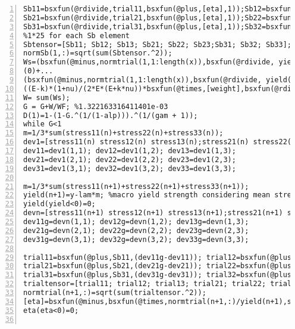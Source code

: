 \begin{lstlisting}[numbers=left, numberstyle=\tiny, keywordstyle=\color{blue!100}, commentstyle=\color{red!30!green!100!blue!100}, frame=shadowbox, rulesepcolor=\color{red!20!green!20!blue!20}]
Sb11=bsxfun(@rdivide,trial11,bsxfun(@plus,[eta],1));Sb12=bsxfun(@rdivide,trial12,bsxfun(@plus,[eta],1));Sb13=bsxfun(@rdivide,trial13,bsxfun(@plus,[eta],1));
Sb21=bsxfun(@rdivide,trial21,bsxfun(@plus,[eta],1));Sb22=bsxfun(@rdivide,trial22,bsxfun(@plus,[eta],1));Sb23=bsxfun(@rdivide,trial23,bsxfun(@plus,[eta],1));
Sb31=bsxfun(@rdivide,trial31,bsxfun(@plus,[eta],1));Sb32=bsxfun(@rdivide,trial32,bsxfun(@plus,[eta],1));Sb33=bsxfun(@rdivide,trial33,bsxfun(@plus,[eta],1));
%1*25 for each Sb element
Sbtensor=[Sb11; Sb12; Sb13; Sb21; Sb22; Sb23;Sb31; Sb32; Sb33];
normSb(1,:)=sqrt(sum(Sbtensor.^2));
Ws=(bsxfun(@minus,normtrial(1,1:length(x)),bsxfun(@rdivide, yield(1),[s]))<=0).*...
(0)+...
(bsxfun(@minus,normtrial(1,1:length(x)),bsxfun(@rdivide, yield(1),[s]))>0).*...
((E-k)*(1+nu)/(2*E*(E+k*nu))*bsxfun(@times,[weight],bsxfun(@rdivide,bsxfun(@times,bsxfun(@minus,normtrial(1,1:length(x)),bsxfun(@rdivide, yield(1),[s])),yield(1)),[s])));
W= sum(Ws); 
G = G+W/WF; %1.322163316411401e-03
D(1)=1-(1-G.^(1/(1-alp))).^(1/(gam + 1));
while G<1
m=1/3*sum(stress11(n)+stress22(n)+stress33(n));
dev1=[stress11(n) stress12(n) stress13(n);stress21(n) stress22(n) stress23(n);stress31(n) stress32(n) stress33(n)]-m*diag([1,1,1]);
dev11=dev1(1,1); dev12=dev1(1,2); dev13=dev1(1,3);
dev21=dev1(2,1); dev22=dev1(2,2); dev23=dev1(2,3);
dev31=dev1(3,1); dev32=dev1(3,2); dev33=dev1(3,3);

m=1/3*sum(stress11(n+1)+stress22(n+1)+stress33(n+1));
yield(n+1)=y-lam*m; %macro yield strength considering mean stress effect
yield(yield<0)=0;
devn=[stress11(n+1) stress12(n+1) stress13(n+1);stress21(n+1) stress22(n+1) stress23(n+1);stress31(n+1) stress32(n+1) stress33(n+1)]-m*diag([1,1,1]);
dev11g=devn(1,1); dev12g=devn(1,2); dev13g=devn(1,3);
dev21g=devn(2,1); dev22g=devn(2,2); dev23g=devn(2,3);
dev31g=devn(3,1); dev32g=devn(3,2); dev33g=devn(3,3);

trial11=bsxfun(@plus,Sb11,(dev11g-dev11)); trial12=bsxfun(@plus,Sb12,(dev12g-dev12));trial13=bsxfun(@plus,Sb13,(dev13g-dev13));
trial21=bsxfun(@plus,Sb21,(dev21g-dev21)); trial22=bsxfun(@plus,Sb22,(dev22g-dev22));trial23=bsxfun(@plus,Sb23,(dev23g-dev23));    
trial31=bsxfun(@plus,Sb31,(dev31g-dev31)); trial32=bsxfun(@plus,Sb32,(dev32g-dev32));trial33=bsxfun(@plus,Sb33,(dev33g-dev33));
trialtensor=[trial11; trial12; trial13; trial21; trial22; trial23;trial31; trial32; trial33];
normtrial(n+1,:)=sqrt(sum(trialtensor.^2));
[eta]=bsxfun(@minus,bsxfun(@times,normtrial(n+1,:)/yield(n+1),s),1); %1*25
eta(eta<0)=0;


\end{lstlisting}
